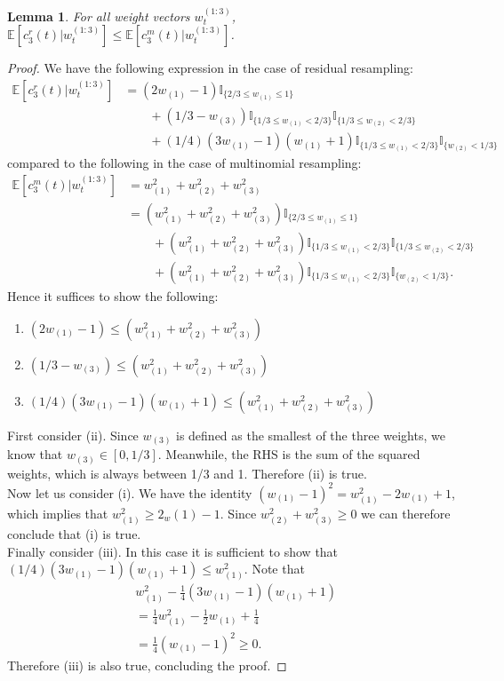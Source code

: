 \documentclass[fleqn]{article}
\newtheorem{lemma}{Lemma}
\theoremstyle{definition}
\newcommand{\E}{\mathbb{E}}
\newcommand{\I}[1]{\mathbb{I}_{\{#1\}}}
\newcommand{\wt}[2][t]{w_{#1}^{(#2)}}
\begin{document}
\begin{lemma}
For all weight vectors $\wt{1:3}$, 
$\E[c_3^r(t) |\wt{1:3}] \leq \E[c_3^m(t) |\wt{1:3}]$.
\end{lemma}
\begin{proof}
We have the following expression in the case of residual resampling:
\begin{align*}
\E[c_3^r(t) |\wt{1:3}] &= (2w_{(1)} -1) \I{2/3 \leq w_{(1)} \leq 1} \\
&\qquad + (1/3 - w_{(3)}) \I{1/3 \leq w_{(1)} < 2/3} \I{1/3 \leq w_{(2)} < 2/3} \\
&\qquad + (1/4)(3w_{(1)} -1)(w_{(1)} +1) \I{1/3 \leq w_{(1)} < 2/3} \I{w_{(2)} <1/3}
\end{align*}
compared to the following in the case of multinomial resampling:
\begin{align*}
\E[c_3^m(t) |\wt{1:3}] &= w_{(1)}^2 + w_{(2)}^2 + w_{(3)}^2 \\
&= (w_{(1)}^2 + w_{(2)}^2 + w_{(3)}^2) \I{2/3 \leq w_{(1)} \leq 1} \\
&\qquad + (w_{(1)}^2 + w_{(2)}^2 + w_{(3)}^2) \I{1/3 \leq w_{(1)} < 2/3} \I{1/3 \leq w_{(2)} < 2/3} \\
&\qquad + (w_{(1)}^2 + w_{(2)}^2 + w_{(3)}^2) \I{1/3 \leq w_{(1)} < 2/3} \I{w_{(2)} <1/3}.
\end{align*}
Hence it suffices to show the following:
\begin{enumerate}[label=(\roman*)]
\item $(2w_{(1)} -1) \leq (w_{(1)}^2 + w_{(2)}^2 + w_{(3)}^2)$
\item $ (1/3 - w_{(3)}) \leq (w_{(1)}^2 + w_{(2)}^2 + w_{(3)}^2)$
\item $ (1/4)(3w_{(1)} -1)(w_{(1)} +1) \leq (w_{(1)}^2 + w_{(2)}^2 + w_{(3)}^2)$\\
\end{enumerate}
First consider (ii). Since $w_{(3)}$ is defined as the smallest of the three weights, we know that $w_{(3)} \in [0,1/3]$. Meanwhile, the RHS is the sum of the squared weights, which is always between 1/3 and 1. Therefore (ii) is true.\\[7pt]
Now let us consider (i). We have the identity $(w_{(1)} -1)^2 = w_{(1)}^2 -2w_{(1)} +1$, which implies that $w_{(1)}^2 \geq 2_w{(1)} - 1$. Since $w_{(2)}^2 + w_{(3)}^2 \geq 0$ we can therefore conclude that (i) is true.\\[7pt]
Finally consider (iii). In this case it is sufficient to show that $(1/4)(3w_{(1)} -1)(w_{(1)} +1) \leq w_{(1)}^2$. Note that
\begin{align*}
& w_{(1)}^2 - \frac{1}{4}(3w_{(1)} -1)(w_{(1)} +1) \\
& = \frac{1}{4} w_{(1)}^2- \frac{1}{2} w_{(1)} + \frac{1}{4} \\
& = \frac{1}{4} (w_{(1)} -1)^2 \geq 0.
\end{align*}
Therefore (iii) is also true, concluding the proof.
\end{proof}
\end{document}
